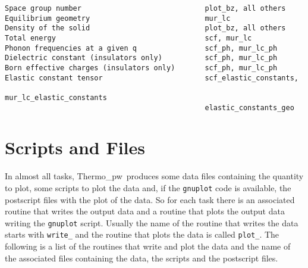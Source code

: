 \documentclass[12pt,a4paper,twoside]{report}
\def\tpw{{\sc Thermo}\_{\sc pw}}
\begin{document}
\begin{footnotesize}
\begin{verbatim}
Space group number                             plot_bz, all others
Equilibrium geometry                           mur_lc
Density of the solid                           plot_bz, all others
Total energy                                   scf, mur_lc
Phonon frequencies at a given q                scf_ph, mur_lc_ph
Dielectric constant (insulators only)          scf_ph, mur_lc_ph
Born effective charges (insulators only)       scf_ph, mur_lc_ph
Elastic constant tensor                        scf_elastic_constants, 
                                               mur_lc_elastic_constants
                                               elastic_constants_geo
\end{verbatim}
\end{footnotesize}

\newpage
{\color{dark-blue}\chapter{Scripts and Files}}
\color{black}

In almost all tasks, \tpw\ produces some data files containing the quantity 
to plot, some scripts to plot the data and, if the \texttt{gnuplot} code
is available, the postscript files with the plot of the data. So for each 
task there is an associated routine
that writes the output data and a routine that plots the output data
writing the \texttt{gnuplot} script. Usually the name of the routine that
writes the data starts with \texttt{write\_} and the routine that plots
the data is called \texttt{plot\_}. The following is a list of the routines
that write and plot the data and the name of the associated files
containing the data, the scripts and the postscript files.
\end{document}
